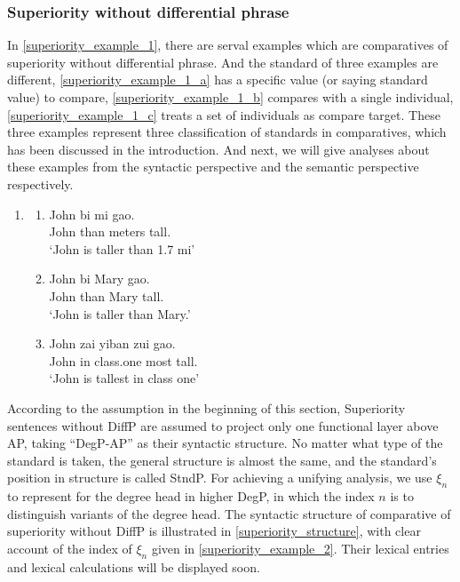 \documentclass{ctexart}
\begin{document}
\subsubsection{Superiority without differential phrase}

\noindent
In \ref{superiority_example_1}, there are serval examples which are comparatives of superiority without differential phrase. And the standard of three examples are different, \ref{superiority_example_1_a} has a specific value (or saying standard value) to compare, \ref{superiority_example_1_b} compares with a single individual, \ref{superiority_example_1_c} treats a set of individuals as compare target. These three examples represent three classification of standards in comparatives, which has been discussed in the introduction. And next, we will give analyses about these examples from the syntactic perspective and the semantic perspective respectively.

\begin{enumerate}
    \item \label{superiority_example_1}
    \begin{enumerate}
        \item \label{superiority_example_1_a}
        John \enspace bi \enspace {} mi \enspace \enspace \enspace gao. \\
        John than  meters tall. \\
        `John is taller than 1.7 mi' 

        \item \label{superiority_example_1_b}
        John \enspace bi \enspace Mary gao. \\
        John than Mary tall. \\
        `John is taller than Mary.' 

        \item \label{superiority_example_1_c}
        John zai \enspace yiban \enspace \enspace zui \enspace gao. \\
        John in \enspace class.one most tall. \\
        `John is tallest in class one' 

    \end{enumerate}
\end{enumerate}

According to the assumption in the beginning of this section, Superiority sentences without DiffP are assumed to project only one functional layer above AP, taking ``DegP-AP'' as their syntactic structure. No matter what type of the standard is taken, the general structure is almost the same, and the standard's position in structure is called StndP. For achieving a unifying analysis, we use $\xi_n$ to represent for the degree head in higher DegP, in which the index $n$ is to distinguish variants of the degree head. The syntactic structure of comparative of superiority without DiffP is illustrated in \ref{superiority_structure}, with clear account of the index of $\xi_n$ given in \ref{superiority_example_2}. Their lexical entries and lexical calculations will be displayed soon.
\end{document}
